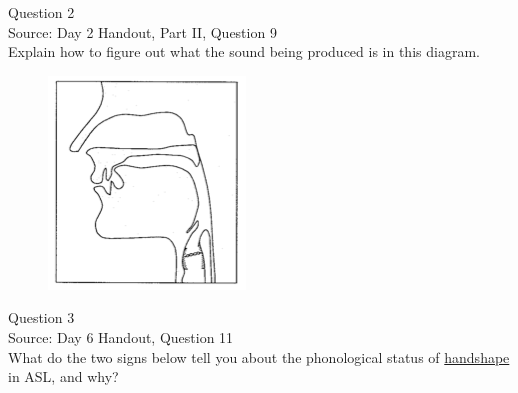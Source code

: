 \documentclass[12pt]{article}
\begin{document}
\newpage

{\large Question 2}\\

Source: Day 2 Handout, Part II, Question 9\\

Explain how to figure out what the sound being produced is in this diagram.\\

\begin{figure}[H]
\includegraphics{../images/sagittal_z.png}
\end{figure}

\newpage

{\large Question 3}\\

Source: Day 6 Handout, Question 11\\

What do the two signs below tell you about the phonological status of \underline{handshape} in ASL, and why?\\
\end{document}
